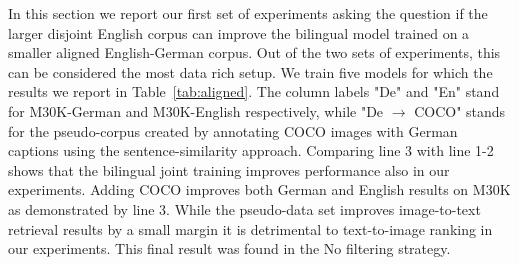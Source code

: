 In this section we report our first set of experiments asking the question if the larger disjoint English corpus can improve the bilingual model trained on a smaller aligned English-German corpus. Out of the two sets of experiments, this can be considered the most data rich setup. 
We train five models for which the results we report in Table~\ref{tab:aligned}. The column labels "De" and "En" stand for
M30K-German and M30K-English respectively, while "De $\rightarrow$ COCO" stands for the pseudo-corpus created by annotating COCO images
with German captions using the sentence-similarity approach. Comparing
line 3 with line 1-2 shows that the bilingual joint training improves
performance also in our experiments. Adding COCO improves both German
and English results on M30K as demonstrated by line 3. While the
pseudo-data set improves image-to-text retrieval results by a small
margin it is detrimental to text-to-image ranking in our experiments. This final result was found in the No filtering strategy.


